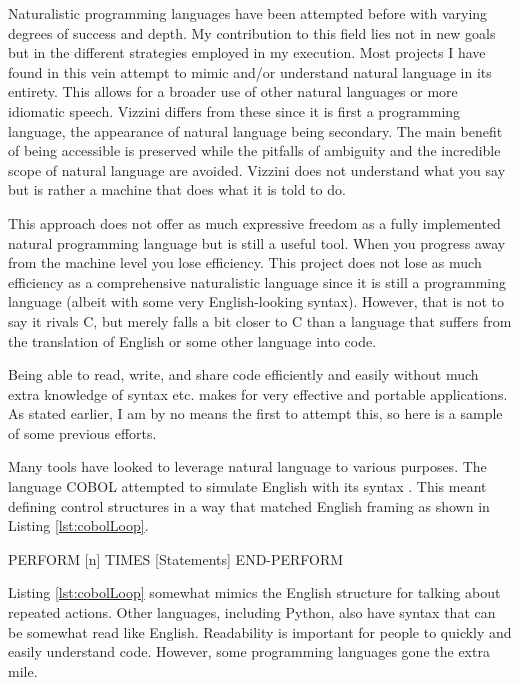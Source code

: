 \documentclass[titlepage]{article}
\newcommand{\lstRef}[1]{Listing \ref{lst:#1}}
\newcommand{\langName}{Vizzini}
\begin{document}
Naturalistic programming languages have been attempted before with varying degrees of success and depth. My contribution to this field lies not in new goals but in the different strategies employed in my execution. Most projects I have found in this vein attempt to mimic and/or understand natural language in its entirety. This allows for a broader use of other natural languages or more idiomatic speech. \langName{} differs from these since it is first a programming language, the appearance of natural language being secondary. The main benefit of being accessible is preserved while the pitfalls of ambiguity and the incredible scope of natural language are avoided. \langName{} does not understand what you say but is rather a machine that does what it is told to do.

This approach does not offer as much expressive freedom as a fully implemented natural programming language but is still a useful tool. When you progress away from the machine level you lose efficiency. This project does not lose as much efficiency as a comprehensive naturalistic language since it is still a programming language (albeit with some very English-looking syntax). However, that is not to say it rivals C, but merely falls a bit closer to C than a language that suffers from the translation of English or some other language into code.

Being able to read, write, and share code efficiently and easily without much extra knowledge of syntax etc. makes for very effective and portable applications. As stated earlier, I am by no means the first to attempt this, so here is a sample of some previous efforts.

Many tools have looked to leverage natural language to various purposes. The language COBOL attempted to simulate English with its syntax \cite{Liu2005MetaforVS}. This meant defining control structures in a way that matched English framing as shown in \lstRef{cobolLoop}.

\begin{codeblock}[language=Cobol,caption={Cobol Loop Frame},label={lst:cobolLoop}]
PERFORM [n] TIMES
	[Statements]
END-PERFORM
\end{codeblock}

\lstRef{cobolLoop} somewhat mimics the English structure for talking about repeated actions. Other languages, including Python, also have syntax that can be somewhat read like English. Readability is important for people to quickly and easily understand code. However, some programming languages gone the extra mile.
\end{document}
